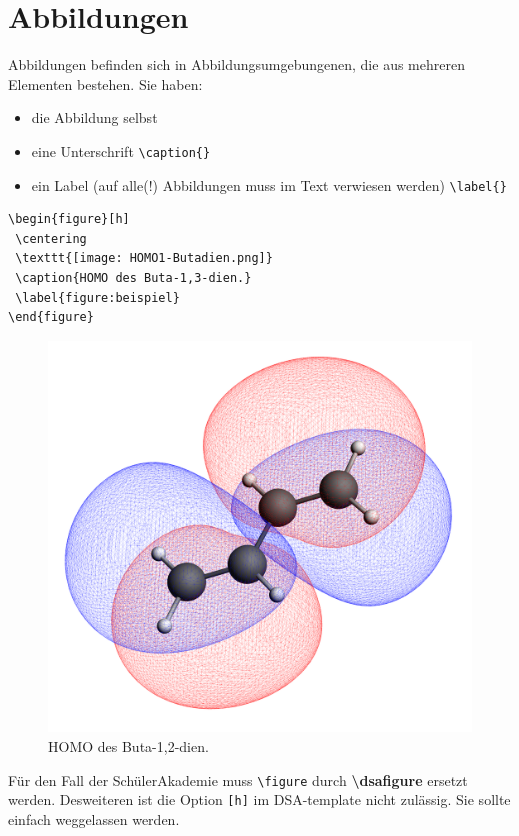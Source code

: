 \section{Abbildungen}
Abbildungen befinden sich in Abbildungsumgebungenen, die
aus mehreren Elementen bestehen. Sie haben:

\begin{itemize}
 \item die Abbildung selbst
 \item eine Unterschrift \lstinline$\caption{}$
 \item ein Label (auf alle(!) Abbildungen muss im Text verwiesen werden)
       \lstinline$\label{}$
\end{itemize}

\begin{lstlisting}
\begin{figure}[h]
 \centering
 \texttt{[image: HOMO1-Butadien.png]}
 \caption{HOMO des Buta-1,3-dien.}
 \label{figure:beispiel}
\end{figure}
\end{lstlisting}

\begin{figure}[h]
 \centering
 \includegraphics[scale=0.02]{HOMO1-Buten.png}
 \caption{HOMO des Buta-1,2-dien.}
 \label{figure:beispiel}
\end{figure}

\danger Für den Fall der SchülerAkademie muss \lstinline$\figure$ durch
        \textbf{\textbackslash dsafigure} ersetzt werden. Desweiteren ist die
        Option \lstinline$[h]$ im DSA-template nicht zulässig. Sie sollte
        einfach weggelassen werden.
